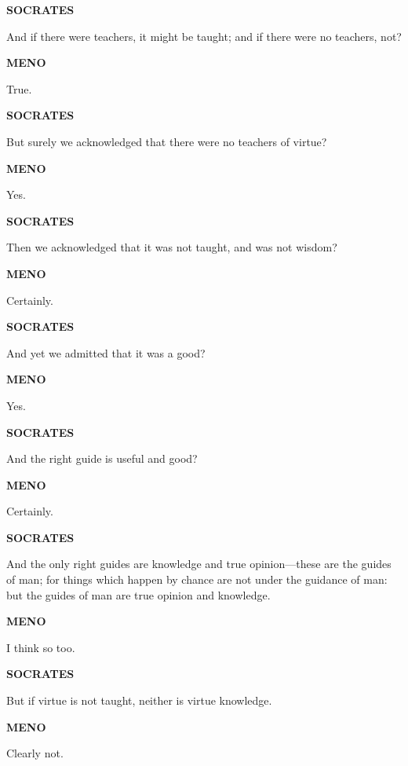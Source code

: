 \documentclass[11pt,letter]{article}
\begin{document}
\par \textbf{SOCRATES}
\par   And if there were teachers, it might be taught; and if there were no teachers, not?

\par \textbf{MENO}
\par   True.

\par \textbf{SOCRATES}
\par   But surely we acknowledged that there were no teachers of virtue?

\par \textbf{MENO}
\par   Yes.

\par \textbf{SOCRATES}
\par   Then we acknowledged that it was not taught, and was not wisdom?

\par \textbf{MENO}
\par   Certainly.

\par \textbf{SOCRATES}
\par   And yet we admitted that it was a good?

\par \textbf{MENO}
\par   Yes.

\par \textbf{SOCRATES}
\par   And the right guide is useful and good?

\par \textbf{MENO}
\par   Certainly.

\par \textbf{SOCRATES}
\par   And the only right guides are knowledge and true opinion—these are the guides of man; for things which happen by chance are not under the guidance of man:  but the guides of man are true opinion and knowledge.

\par \textbf{MENO}
\par   I think so too.

\par \textbf{SOCRATES}
\par   But if virtue is not taught, neither is virtue knowledge.

\par \textbf{MENO}
\par   Clearly not.
\end{document}

